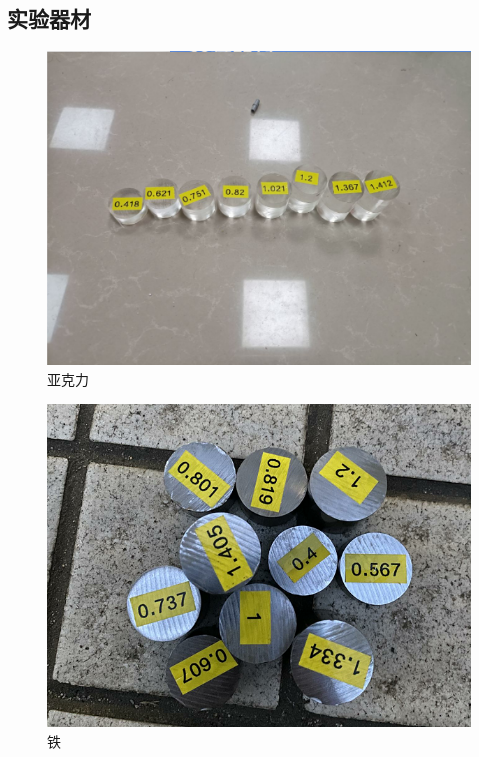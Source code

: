 \documentclass[UTF8]{gapd}
\begin{document}
\subsection{实验器材}
\begin{figure}[h]%
	\centering
	\includegraphics[width=1.1\columnwidth]{images/亚克力}
	\caption{亚克力}
	\label{fig:P2}%
\end{figure}
\begin{figure}[h]%
	\centering
	\includegraphics[width=1.1\columnwidth]{images/铁}
	\caption{铁}
	\label{fig:P2}%
\end{figure}
\end{document}
